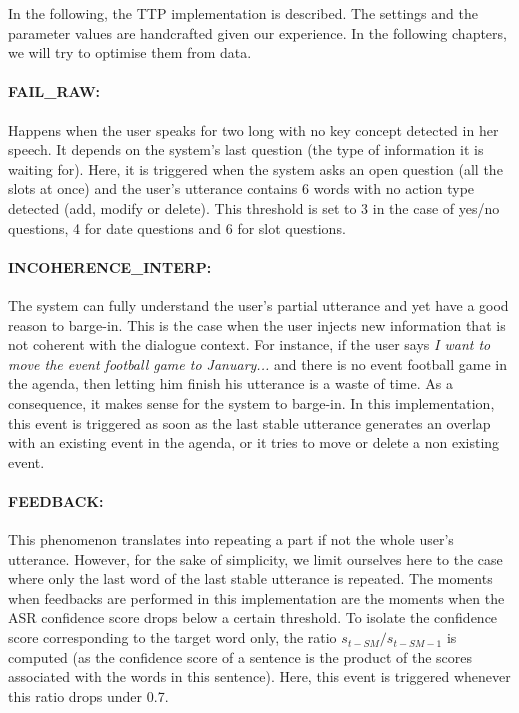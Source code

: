     	In the following, the TTP implementation is described. The settings and the parameter values are handcrafted given our experience. In the following chapters, we will try to optimise them from data.
    
    	 \paragraph{FAIL\_RAW:} Happens when the user speaks for two long with no key concept detected in her speech. It depends on the system's last question (the type of information it is waiting for). Here, it is triggered when the system asks an open question (all the slots at once) and the user's utterance contains 6 words with no action type detected (add, modify or delete). This threshold is set to 3 in the case of yes/no questions, 4 for date questions and 6 for slot questions.
         
         \paragraph{INCOHERENCE\_INTERP:} The system can fully understand the user's partial utterance and yet have a good reason to barge-in. This is the case when the user injects new information that is not coherent with the dialogue context. For instance, if the user says \textit{I want to move the event football game to January...} and there is no event football game in the agenda, then letting him finish his utterance is a waste of time. As a consequence, it makes sense for the system to barge-in. In this implementation, this event is triggered as soon as the last stable utterance generates an overlap with an existing event in the agenda, or it tries to move or delete a non existing event.
         
         \paragraph{FEEDBACK:} This phenomenon translates into repeating a part if not the whole user's utterance. However, for the sake of simplicity, we limit ourselves here to the case where only the last word of the last stable utterance is repeated. The moments when feedbacks are performed in this implementation are the moments when the ASR confidence score drops below a certain threshold. To isolate the confidence score corresponding to the target word only, the ratio $s_{t-SM}/s_{t-SM-1}$ is computed (as the confidence score of a sentence is the product of the scores associated with the words in this sentence). Here, this event is triggered whenever this ratio drops under 0.7.
         
